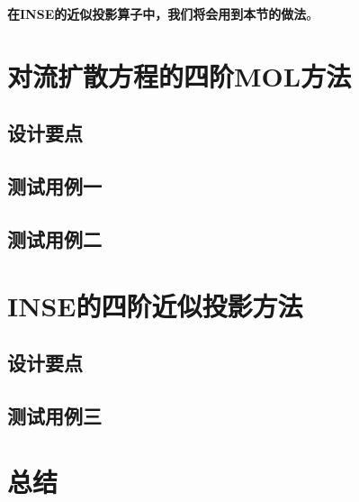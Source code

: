 \documentclass[lang=cn,10pt,bibend=bibtex]{elegantbook}
\begin{document}
\textbf{在INSE的近似投影算子中，我们将会用到本节的做法}。

\newpage

\chapter{对流扩散方程的四阶MOL方法}

\section{设计要点}

\section{测试用例一}

\section{测试用例二}

\chapter{INSE的四阶近似投影方法}

\section{设计要点}

\section{测试用例三}

\chapter{总结}

\printbibliography[heading=bibintoc,title=\ebibname]
\end{document}

